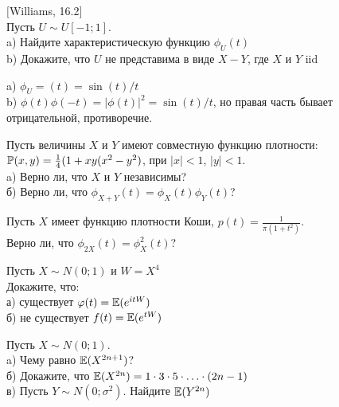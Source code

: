 \begin{solution}
\begin{solution}
\begin{solution}
\begin{solution}
\begin{solution}
\begin{solution}
\begin{problem}
$[$Williams, 16.2$]$ \\
Пусть $U\sim U[-1;1]$. \\
a) Найдите характеристическую функцию $\phi_{U}(t)$ \\
b) Докажите, что $U$ не представима в виде $X-Y$, где $X$ и $Y$
iid 
\end{problem} 
\begin{solution} 


a) $\phi_{U}=(t)=\sin(t)/t$ \\
b) $\phi(t)\phi(-t)=|\phi(t)|^{2}=\sin(t)/t$, но правая часть
бывает отрицательной, противоречие. 
\end{solution}

\begin{problem}
Пусть величины $X$ и $Y$ имеют совместную функцию плотности: \\
$\P(x,y)=\frac{1}{4}(1+xy(x^{2}-y^{2})$, при $|x|<1$, $|y|<1$. \\
a) Верно ли, что $X$ и $Y$ независимы? \\
б) Верно ли, что $\phi_{X+Y}(t)=\phi_{X}(t)\phi_{Y}(t)$? 
\end{problem} 
\begin{solution} 

\end{solution}

\begin{problem}
Пусть $X$ имеет функцию плотности Коши,
$p(t)=\frac{1}{\pi(1+t^{2})}$. \\
Верно ли, что $\phi_{2X}(t)=\phi_{X}^{2}(t)$? 
\end{problem} 
\begin{solution} 

\end{solution}

\begin{problem}
Пусть $X\sim N(0;1)$ и $W=X^{4}$ \\
Докажите, что: \\
а) существует $\varphi(t)=\E(e^{itW})$ \\
б) не существует $f(t)=\E(e^{tW})$ 
\end{problem} 
\begin{solution} 

\end{solution}

\begin{problem}
Пусть $X\sim N(0;1)$. \\
a) Чему равно $\E(X^{2n+1})$? \\
б) Докажите, что $\E(X^{2n})=1\cdot 3\cdot 5\cdot\ldots\cdot(2n-1)$ \\
в) Пусть $Y\sim N(0;\sigma^{2})$. Найдите $\E(Y^{2n})$ 
\end{problem} 
\begin{solution} 


\end{solution}
\end{solution}
\end{solution}
\end{solution}
\end{solution}
\end{solution}
\end{solution}
